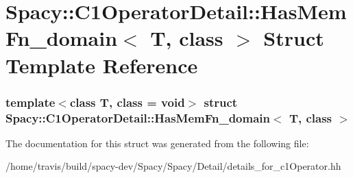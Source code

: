 \hypertarget{structSpacy_1_1C1OperatorDetail_1_1HasMemFn__domain}{\section{\-Spacy\-:\-:\-C1\-Operator\-Detail\-:\-:\-Has\-Mem\-Fn\-\_\-domain$<$ \-T, class $>$ \-Struct \-Template \-Reference}
\label{structSpacy_1_1C1OperatorDetail_1_1HasMemFn__domain}
}
\subsubsection*{template$<$class T, class = void$>$ struct Spacy\-::\-C1\-Operator\-Detail\-::\-Has\-Mem\-Fn\-\_\-domain$<$ T, class $>$}



\-The documentation for this struct was generated from the following file\-:\begin{DoxyCompactItemize}
\item 
/home/travis/build/spacy-\/dev/\-Spacy/\-Spacy/\-Detail/details\-\_\-for\-\_\-c1\-Operator.\-hh\end{DoxyCompactItemize}
